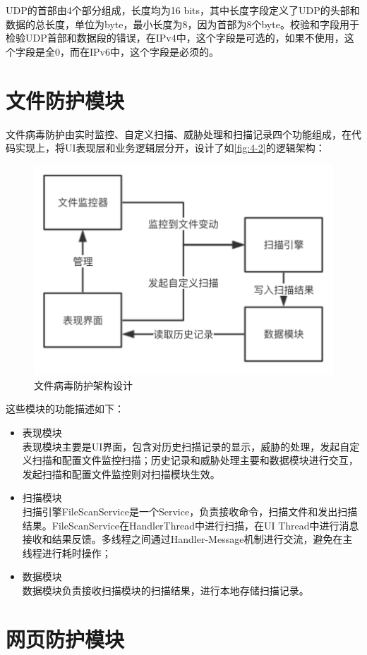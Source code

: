 \documentclass[format=final, language=chinese, degree=fyp]{hustthesis}
\begin{document}
UDP的首部由4个部分组成，长度均为16 bits，其中长度字段定义了UDP的头部和数据的总长度，单位为byte，最小长度为8，因为首部为8个byte。校验和字段用于检验UDP首部和数据段的错误，在IPv4中，这个字段是可选的，如果不使用，这个字段是全0，而在IPv6中，这个字段是必须的。


\section{文件防护模块}

文件病毒防护由实时监控、自定义扫描、威胁处理和扫描记录四个功能组成，在代码实现上，将UI表现层和业务逻辑层分开，设计了如\autoref{fig:4-2}的逻辑架构：


\begin{figure}[!h]
\centering
\includegraphics[width=.6\textwidth]{function_2_ori.png}
\caption{文件病毒防护架构设计}\label{fig:4-2}
\end{figure}

这些模块的功能描述如下：

\begin{itemize}
    \item 表现模块\\ 表现模块主要是UI界面，包含对历史扫描记录的显示，威胁的处理，发起自定义扫描和配置文件监控扫描；历史记录和威胁处理主要和数据模块进行交互，发起扫描和配置文件监控则对扫描模块生效。
    \item 扫描模块\\ 扫描引擎FileScanService是一个Service，负责接收命令，扫描文件和发出扫描结果。FileScanService在HandlerThread中进行扫描，在UI Thread中进行消息接收和结果反馈。多线程之间通过Handler-Message机制进行交流，避免在主线程进行耗时操作；
    \item 数据模块\\ 数据模块负责接收扫描模块的扫描结果，进行本地存储扫描记录。
\end{itemize}

\section{网页防护模块}
\end{document}
